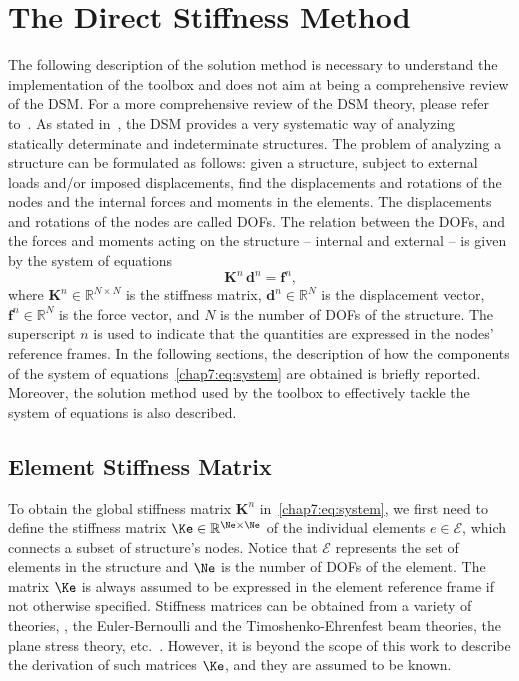 
\section{The Direct Stiffness Method}
\label{chap7:sec:solution_method}

The following description of the solution method is necessary to understand the implementation of the toolbox and does not aim at being a comprehensive review of the \ac{DSM}. For a more comprehensive review of the \ac{DSM} theory, please refer to~\cite{turner1959direct, turner1964further, logan2002first, hutton2004fundamentals}. As stated in~\cite{samuelsson2006history}, the \ac{DSM} provides a very systematic way of analyzing statically determinate and indeterminate structures. The problem of analyzing a structure can be formulated as follows: given a structure, subject to external loads and/or imposed displacements, find the displacements and rotations of the nodes and the internal forces and moments in the elements. The displacements and rotations of the nodes are called \acp{DOF}. The relation between the \acp{DOF}, and the forces and moments acting on the structure -- internal and external -- is given by the system of equations
%
\begin{equation}
  \label{chap7:eq:system}
  \mathbf{K}^{n} \, \mathbf{d}^{n} = \mathbf{f}^{n} \text{,}
\end{equation}
%
where $\mathbf{K}^{n} \in \mathbb{R}^{N \times N}$ is the stiffness matrix, $\mathbf{d}^{n} \in \mathbb{R}^{N}$ is the displacement vector, $\mathbf{f}^{n} \in \mathbb{R}^{N}$ is the force vector, and $N$ is the number of \acp{DOF} of the structure. The superscript $n$ is used to indicate that the quantities are expressed in the nodes' reference frames. In the following sections, the description of how the components of the system of equations~\eqref{chap7:eq:system} are obtained is briefly reported. Moreover, the solution method used by the toolbox to effectively tackle the system of equations is also described.

\subsection{Element Stiffness Matrix}

To obtain the global stiffness matrix $\mathbf{K}^{n}$ in~\eqref{chap7:eq:system}, we first need to define the stiffness matrix $\Ke \in \mathbb{R}^{\Ne \times \Ne}$ of the individual elements $e \in \mathcal{E}$, which connects a subset of structure's nodes. Notice that $\mathcal{E}$ represents the set of elements in the structure and $\Ne$ is the number of \acp{DOF} of the element. The matrix $\Ke$ is always assumed to be expressed in the element reference frame if not otherwise specified. Stiffness matrices can be obtained from a variety of theories, \eg{}, the Euler-Bernoulli and the Timoshenko-Ehrenfest beam theories, the plane stress theory, etc.~\cite{hutton2004fundamentals}. However, it is beyond the scope of this work to describe the derivation of such matrices $\Ke$, and they are assumed to be known.

